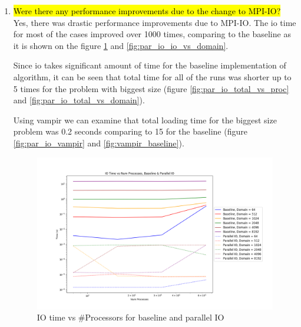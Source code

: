 \begin{enumerate}
  \item \hl{Were there any performance improvements due to the change to MPI-IO?}
  Yes, there was drastic performance improvements due to MPI-IO. The io time for most of the cases improved over 1000
  times, comparing to the baseline as it is shown on the figure \ref{fig:par_io_io_vs_proc} and 
  \ref{fig:par_io_io_vs_domain}.

  Since io takes significant amount of time for the baseline implementation of algorithm, it can be seen that 
  total time for all of the runs was shorter up to 5 times for the problem with biggest size (figure 
  \ref{fig:par_io_total_vs_proc} and \ref{fig:par_io_total_vs_domain}).

  Using vampir we can examine that total loading time for the biggest size problem was 0.2 seconds comparing to 15 
  for the baseline (figure \ref{fig:par_io_vampir} and \ref{fig:vampir_baseline}).

  \begin{figure}[p] %
    \begin{center}
      \includegraphics[width=.9\linewidth]{Figures/io/io_multdomain_haswell_io_baseline.png} %
      \caption{IO time vs \#Processors for baseline and parallel IO}
      \label{fig:par_io_io_vs_proc}
    \end{center}
 \end{figure}
 

\end{enumerate}
